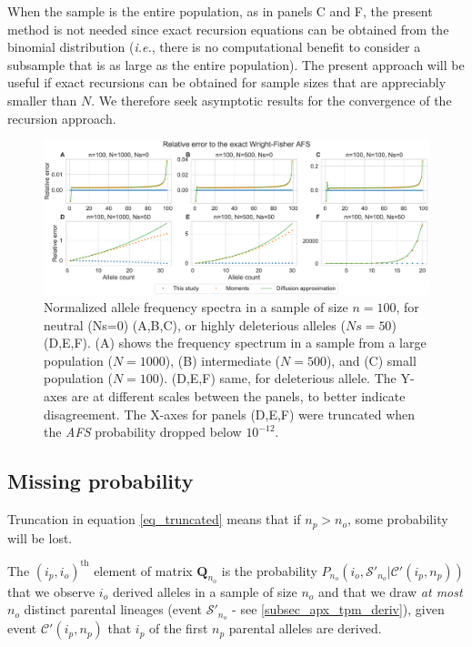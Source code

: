 \documentclass[review]{elsarticle}
\newcommand{\sgcomment}[1]{{\color{red}{SG: #1}}}
\newcommand{\ikcomment}[1]{{\color{blue}{IK: #1}}}
\begin{document}
When the sample is the entire population, as in panels C and F, the present method is not needed since
exact recursion equations can be obtained from the binomial distribution 
(\textit{i.e.}, there is no computational benefit to consider a subsample that is as large as the entire population). 
The present approach will be useful if exact recursions can be obtained for sample sizes that are appreciably smaller
than $N$. We therefore seek asymptotic results for the convergence of the recursion approach.

\begin{figure}
  \centering
  \includegraphics[width=0.7\textheight]{fig/strong_selection_six_panel.pdf}
  \caption{Normalized allele frequency spectra in a sample of size $n=100$, for neutral (Ns=0)
    (A,B,C), or highly deleterious alleles ($Ns=50$) (D,E,F). (A) shows the frequency spectrum in a
    sample from a large population ($N=1000$), (B) intermediate ($N=500$), and (C) small population
    ($N=100$). (D,E,F) same, for deleterious allele. The Y-axes are at different scales between the
    panels, to better indicate disagreement. The X-axes for panels (D,E,F) were truncated
    when the \textit{AFS} probability dropped below $10^{-12}$. }
  \label{fig_strong-selection}
\end{figure}

\subsection{Missing probability}
\label{subsec_missing}

Truncation in equation \ref{eq_truncated} means that if $n_p > n_o$, some probability will be lost. 
 \sgcomment{Did you do re-normalization of the truncated matrix?} \ikcomment{I did for figure 3, yes}

The $(i_p,i_o)^\text{th}$ element of matrix $\mathbf{Q}_{n_o}$ is the probability
$P_{n_o}(i_o, \mathcal{S'}_{n_o}| \mathcal{C'}(i_p,n_p))$ that we observe $i_o$ derived alleles in
a sample of size $n_o$ and that we draw \emph{at most} $n_o$ distinct parental lineages (event
$\mathcal{S'}_{n_o}$ - see \ref{subsec_apx_tpm_deriv}), given event $\mathcal{C'}(i_p,n_p)$ that $i_p$ of the first
$n_p$ parental alleles are derived.
\end{document}
